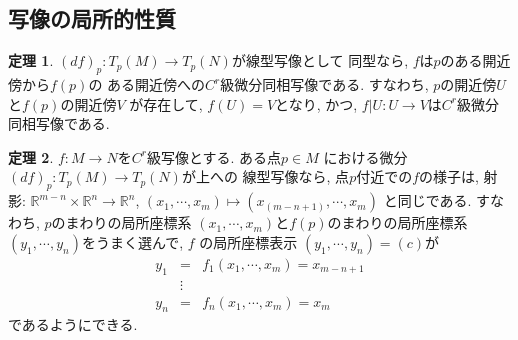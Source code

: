 \documentclass[a4j,12pt]{jarticle}
\theoremstyle{definition}
\newtheorem{theorem}{定理}[section]
\begin{document}
\subsection{写像の局所的性質}
\begin{theorem}\label{theo:f^(-1)theorem}
    $(df)_p:T_p(M)\to T_p(N)$が線型写像として
    同型なら, $f$は$p$のある開近傍から$f(p)$の
    ある開近傍への$C^r$級微分同相写像である. 
    すなわち, $p$の開近傍$U$と$f(p)$の開近傍$V$
    が存在して, $f(U)=V$となり, かつ, 
    $f|U:U \to V$は$C^r$級微分同相写像である. 
\end{theorem}
\begin{theorem}\label{theo: projection theorem}
    $f:M\to N$を$C^r$級写像とする. ある点$p\in M$
    における微分$(df)_p:T_p(M)\to T_p(N)$が上への
    線型写像なら, 点$p$付近での$f$の様子は, 射影:
    $\mathbb{R}^{m-n} \times \mathbb{R}^n \to \mathbb{R}^n$, 
    $(x_1, \cdots ,x_m)\mapsto (x_(m-n+1), \cdots ,x_m)$
    と同じである. すなわち, $p$のまわりの局所座標系
    $(x_1,\cdots ,x_m)$と$f(p)$のまわりの局所座標系
    $(y_1, \cdots ,y_n)$をうまく選んで, $f$
    の局所座標表示
    $(y_1, \cdots ,y_n)=(c)$が
    \begin{eqnarray*}
        y_1&=&f_1(x_1,\cdots ,x_m)=x_{m-n+1}\\
        &\vdots& \\
        y_n&=&f_n(x_1,\cdots ,x_m)=x_m
    \end{eqnarray*}
    であるようにできる. 
\end{theorem}
\end{document}
